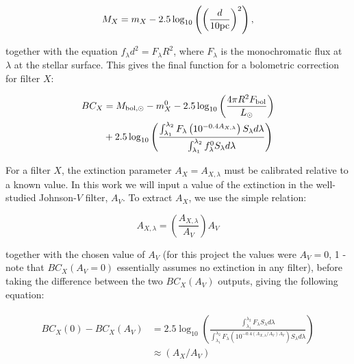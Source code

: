 \documentclass[12pt, a4paper]{report}
\begin{document}
\begin{equation}
M_{X} = m_{X} - 2.5 \log_{10}\left( \left( \frac{d}{10 \textnormal{pc}} \right)^{2} \right),
\label{abs_mag_def}
\end{equation}

together with the equation $f_{\lambda}d^{2}=F_{\lambda}R^{2}$, where $F_{\lambda}$ is the monochromatic flux at $\lambda$ at the stellar surface. This gives the final function for a bolometric correction for filter $X$:

\begin{align}
\begin{split}
BC_{X} &= M_{\textnormal{bol},\odot} - m_{X}^{0} - 2.5 \log_{10} \left( \frac{4\pi R^{2}F_{\textnormal{bol}}}{L_{\odot}} \right) \\
&+ 2.5 \log_{10} \left( \frac{\int_{\lambda_{1}}^{\lambda_{2}} F_{\lambda} \left( 10^{-0.4 A_{X,\lambda}} \right) S_{\lambda} d\lambda}{\int_{\lambda_{1}}^{\lambda_{2}} f_{\lambda}^{0} S_{\lambda} d\lambda} \right)
\label{BC_extinc}
\end{split}
\end{align}

For a filter $X$, the extinction parameter $A_{X} = A_{X,\lambda}$ must be calibrated relative to a known value. In this work we will input a value of the extinction in the well-studied Johnson-$V$ filter, $A_{V}$. To extract $A_{X}$, we use the simple relation:

\begin{equation}
A_{X,\lambda} = \left( \frac{A_{X,\lambda}}{A_{V}} \right) A_{V}
\label{ratio_eq}
\end{equation}

together with the chosen value of $A_{V}$ (for this project the values were $A_{V} = 0$, 1 - note that $BC_{X}(A_{V}=0)$ essentially assumes no extinction in any filter), before taking the difference between the two $BC_{X}(A_{V})$ outputs, giving the following equation:

\begin{align}
\begin{split}
BC_{X}(0) - BC_{X}(A_{V}) &= 2.5 \log_{10} \left( \frac{\int_{\lambda_{1}}^{\lambda_{2}} F_{\lambda}  S_{\lambda} d\lambda}{\int_{\lambda_{1}}^{\lambda_{2}} F_{\lambda}\left( 10^{-0.4 \left(A_{X,\lambda}/A_{V}\right) A_{V}} \right) S_{\lambda} d\lambda} \right) \\
&\approx \left(A_{X}/A_{V}\right)
\label{BCs_diff}
\end{split}
\end{align}
\end{document}
